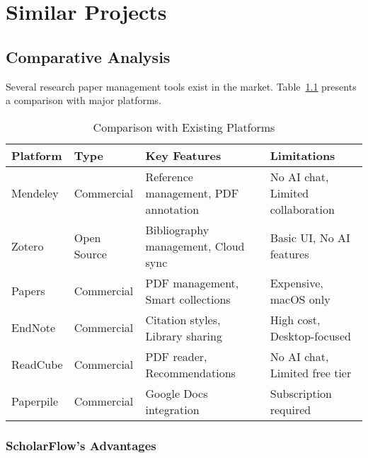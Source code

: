 \chapter{Similar Projects}
\label{ch:similar-projects}

\section{Comparative Analysis}
\label{sec:comparative-analysis}

Several research paper management tools exist in the market. Table~\ref{tab:competitors} presents a comparison with major platforms.

\begin{table}[H]
\centering
\caption{Comparison with Existing Platforms}
\label{tab:competitors}
\small
\setlength{\tabcolsep}{6pt}%
\renewcommand{\arraystretch}{1.15}%
\begin{tabularx}{\textwidth}{@{} l l >{\raggedright\arraybackslash}X >{\raggedright\arraybackslash}X @{} }
    \toprule
    \textbf{Platform} & \textbf{Type} & \textbf{Key Features} & \textbf{Limitations} \\
\midrule
Mendeley & Commercial & Reference management, PDF annotation & No AI chat, Limited collaboration \\
Zotero & Open Source & Bibliography management, Cloud sync & Basic UI, No AI features \\
Papers & Commercial & PDF management, Smart collections & Expensive, macOS only \\
EndNote & Commercial & Citation styles, Library sharing & High cost, Desktop-focused \\
ReadCube & Commercial & PDF reader, Recommendations & No AI chat, Limited free tier \\
Paperpile & Commercial & Google Docs integration & Subscription required \\
\bottomrule
\end{tabularx}
\end{table}

\subsection{ScholarFlow's Advantages}


